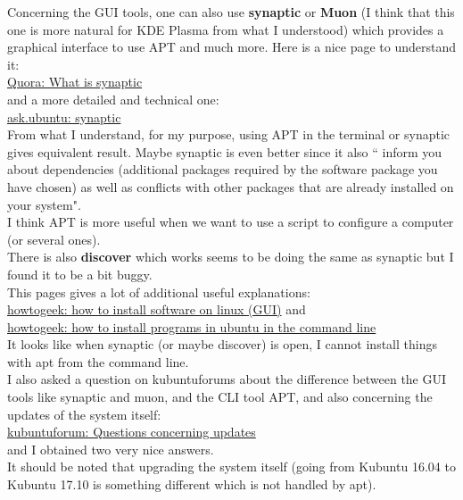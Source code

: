 \documentclass[11pt,a4paper]{article} %
\begin{document}
Concerning the GUI tools, one can also use \textbf{synaptic} or \textbf{Muon} (I think that this one is more natural for KDE Plasma from what I understood) which provides a graphical interface to use APT and much more. Here is a nice page to understand it:\\
\href{https://www.quora.com/What-is-%E2%80%9Csynaptic%E2%80%9D-in-Ubuntu#}{Quora: What is synaptic}\\
and a more detailed and technical one:\\
\href{https://apps.ubuntu.com/cat/applications/synaptic/}{ask.ubuntu: synaptic}\\
From what I understand, for my purpose, using APT in the terminal or synaptic gives equivalent result. Maybe synaptic is even better since it also `` inform you about dependencies (additional packages required by the software package you have chosen) as well as conflicts with other packages that are already installed on your system".\\
I think APT is more useful when we want to use a script to configure a computer (or several ones).\\
There is also \textbf{discover} which works seems to be doing the same as synaptic but I found it to be a bit buggy.\\
This pages gives a lot of additional useful explanations:\\
\href{https://www.howtogeek.com/191245/beginner-geek-how-to-install-software-on-linux/}{howtogeek: how to install software on linux (GUI)}
and\\
\href{https://www.howtogeek.com/63997/how-to-install-programs-in-ubuntu-in-the-command-line/}{howtogeek: how to install programs in ubuntu in the command line}\\
It looks like when synaptic (or maybe discover) is open, I cannot install things with apt from the command line.
\\

I also asked a question on kubuntuforums about the difference between the GUI tools like synaptic and muon, and the CLI tool APT, and also concerning the updates of the system itself:\\
\href{https://www.kubuntuforums.net/showthread.php/72837-Questions-concerning-updates?p=408616#post408616}{kubuntuforum: Questions concerning updates}\\
and I obtained two very nice answers.\\

It should be noted that upgrading the system itself (going from Kubuntu 16.04 to Kubuntu 17.10 is something different which is not handled by apt).
\end{document}
